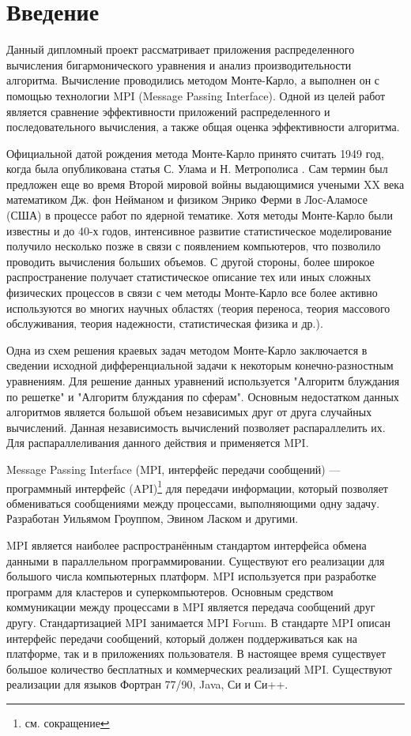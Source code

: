 \chapter*{Введение}
Данный дипломный проект рассматривает приложения распределенного вычисления бигармонического уравнения и анализ производительности алгоритма. Вычисление проводились методом Монте-Карло, а выполнен он с помощью технологии MPI (Message Passing Interface). Одной из целей работ является сравнение эффективности приложений распределенного и последовательного вычисления, а также общая оценка эффективности алгоритма.

Официальной датой рождения метода Монте-Карло принято считать 1949 год, когда была опубликована статья С. Улама и Н. Метрополиса \cite{int:fist} . Сам термин был предложен еще во время Второй мировой войны выдающимися учеными XX века математиком Дж. фон Нейманом и физиком Энрико Ферми в Лос-Аламосе (США) в процессе работ по ядерной тематике. Хотя методы Монте-Карло были известны и до 40-х годов, интенсивное развитие статистическое моделирование получило несколько позже в связи с появлением компьютеров, что позволило проводить вычисления больших объемов. С другой стороны, более широкое распространение получает статистическое описание тех или иных сложных физических процессов в связи с чем методы Монте-Карло все более активно используются во многих научных областях (теория переноса, теория массового обслуживания, теория надежности, статистическая физика и др.).

Одна из схем решения краевых задач методом Монте-Карло заключается в сведении исходной дифференциальной задачи к некоторым конечно-разностным уравнениям. Для решение данных уравнений используется "Алгоритм блуждания по решетке" и "Алгоритм блуждания по сферам". Основным недостатком данных алгоритмов является большой объем независимых друг от друга случайных вычислений. Данная независимость вычислений позволяет распараллелить их. Для распараллеливания данного действия и применяется MPI. 

Message Passing Interface (MPI, интерфейс передачи сообщений) — программный интерфейс (API)\footnote{см. сокращение} для передачи информации, который позволяет обмениваться сообщениями между процессами, выполняющими одну задачу. Разработан Уильямом Гроуппом, Эвином Ласком и другими.

MPI является наиболее распространённым стандартом интерфейса обмена данными в параллельном программировании. Существуют его реализации для большого числа компьютерных платформ. MPI используется при разработке программ для кластеров и суперкомпьютеров. Основным средством коммуникации между процессами в MPI является передача сообщений друг другу. Стандартизацией MPI занимается MPI Forum. В стандарте MPI описан интерфейс передачи сообщений, который должен поддерживаться как на платформе, так и в приложениях пользователя. В настоящее время существует большое количество бесплатных и коммерческих реализаций MPI. Существуют реализации для языков Фортран 77/90, Java, Си и Си++.

